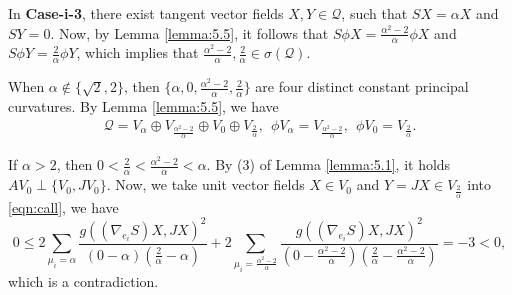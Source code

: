 \documentclass[reqno]{amsart}%
\theoremstyle{definition}
\numberwithin{equation}{section}
\begin{document}
In {\bf Case-i-3}, there exist tangent vector fields $X,Y\in\mathcal{Q}$, such that
$SX=\alpha X$ and $SY=0$. Now, by Lemma \ref{lemma:5.5}, it follows that $S\phi X=\tfrac{\alpha^2-2}{\alpha}\phi X$ and $S\phi Y=\frac{2}{\alpha}\phi Y$,
which implies that $\tfrac{\alpha^2-2}{\alpha},\frac{2}{\alpha}\in \sigma(\mathcal{Q})$.

When $\alpha\notin\{\sqrt{2},2\}$, then $\{\alpha,0,\tfrac{\alpha^2-2}{\alpha},\frac{2}{\alpha}\}$
are four distinct constant principal curvatures. By Lemma \ref{lemma:5.5}, we have
$$
\begin{aligned}
\mathcal{Q}=V_\alpha\oplus V_{\frac{\alpha^2-2}{\alpha}}\oplus V_0\oplus V_{\frac{2}{\alpha}}, \ \ \phi V_\alpha= V_{\frac{\alpha^2-2}{\alpha}},\ \ \phi V_0= V_{\frac{2}{\alpha}}.
\end{aligned}
$$

If $\alpha>2$, then $0<\frac{2}{\alpha}<\frac{\alpha^2-2}{\alpha}<\alpha$. By (3) of Lemma \ref{lemma:5.1}, it holds
$AV_0\perp \{V_0,JV_0\}$. Now, we take unit vector fields $X\in V_0$ and $Y=JX\in V_{\frac{2}{\alpha}}$ into \eqref{eqn:call}, we have
$$
0\leq2\sum_{\mu_i=\alpha}\frac{g((\nabla_{e_i} S)X,JX)^2}{(0-\alpha)(\frac{2}{\alpha}-\alpha)}+2\sum_{\mu_i=\frac{\alpha^2-2}{\alpha}}\frac{g((\nabla_{e_i} S)X,JX)^2}{(0-\frac{\alpha^2-2}{\alpha})(\frac{2}{\alpha}-\frac{\alpha^2-2}{\alpha})}
=-3<0,
$$
which is a contradiction.
\end{document}
